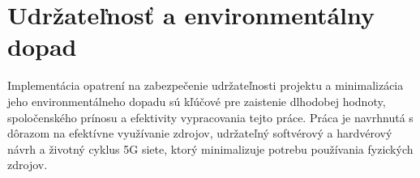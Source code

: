 \section{Udržateľnosť a environmentálny dopad}
\par{
Implementácia opatrení na zabezpečenie udržateľnosti projektu a minimalizácia jeho environmentálneho dopadu sú kľúčové pre zaistenie dlhodobej hodnoty, spoločenského prínosu a efektivity vypracovania tejto práce. Práca je navrhnutá s dôrazom na efektívne využívanie zdrojov, udržateľný softvérový a hardvérový návrh a životný cyklus 5G siete, ktorý minimalizuje potrebu používania fyzických zdrojov.
}

